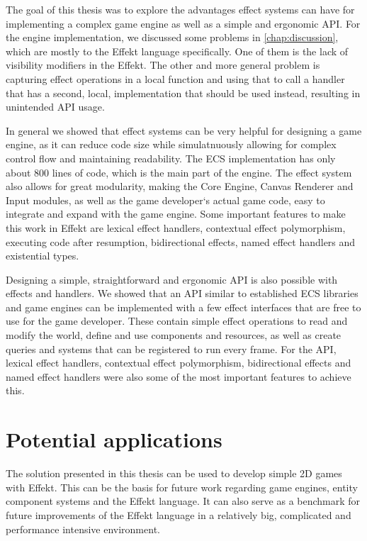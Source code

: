 \label{chap:conclusion}

The goal of this thesis was to explore the advantages effect systems can have for implementing a complex game engine as well as a simple and ergonomic API. For the engine implementation, we discussed some problems in \cref{chap:discussion}, which are mostly to the Effekt language specifically. One of them is the lack of visibility modifiers in the Effekt. The other and more general problem is capturing effect operations in a local function and using that to call a handler that has a second, local, implementation that should be used instead, resulting in unintended API usage.

In general we showed that effect systems can be very helpful for designing a game engine, as it can reduce code size while simulatnuously allowing for complex control flow and maintaining readability. The ECS implementation has only about 800 lines of code, which is the main part of the engine. The effect system also allows for great modularity, making the Core Engine, Canvas Renderer and Input modules, as well as the game developer`s actual game code, easy to integrate and expand with the game engine. Some important features to make this work in Effekt are lexical effect handlers, contextual effect polymorphism, executing code after resumption, bidirectional effects, named effect handlers and existential types.

Designing a simple, straightforward and ergonomic API is also possible with effects and handlers. We showed that an API similar to established ECS libraries and game engines can be implemented with a few effect interfaces that are free to use for the game developer. These contain simple effect operations to read and modify the world, define and use components and resources, as well as create queries and systems that can be registered to run every frame. For the API, lexical effect handlers, contextual effect polymorphism, bidirectional effects and named effect handlers were also some of the most important features to achieve this.

\section*{Potential applications}

The solution presented in this thesis can be used to develop simple 2D games with Effekt. This can be the basis for future work regarding game engines, entity component systems and the Effekt language. It can also serve as a benchmark for future improvements of the Effekt language in a relatively big, complicated and performance intensive environment.

